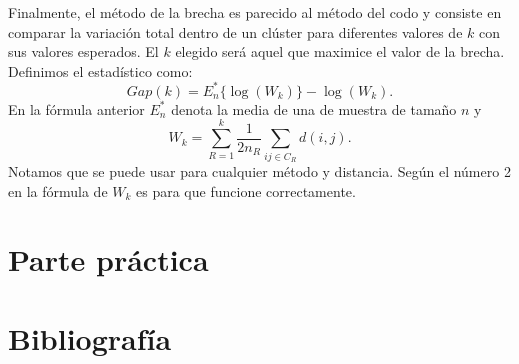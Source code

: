 \documentclass[a4paper, 20pt]{article}
\begin{document}
Finalmente, el método de la brecha es parecido al método del codo y consiste en comparar la variación total dentro de un clúster para diferentes valores de $ k $ con sus valores esperados. El $ k $ elegido será aquel que maximice el valor de la brecha. Definimos el estadístico como:
\[
Gap(k) = E^*_n\{ \log(W_k)\} - \log(W_k).
\]
En la fórmula anterior $ E^*_n $ denota la media de una de muestra de tamaño $ n $ y 
\[
W_k = \sum_{R = 1}^{k}\frac{1}{2 n_R}\sum_{i j \in C_R} d(i,j).
\]
Notamos que se puede usar para cualquier método y distancia. Según \cite{tibshirani2001estimating} el número 2 en la fórmula de $ W_k $ es para que funcione correctamente.
\section{Parte práctica}
\newpage
\section{Bibliografía}
\nocite{*}


\end{document}
